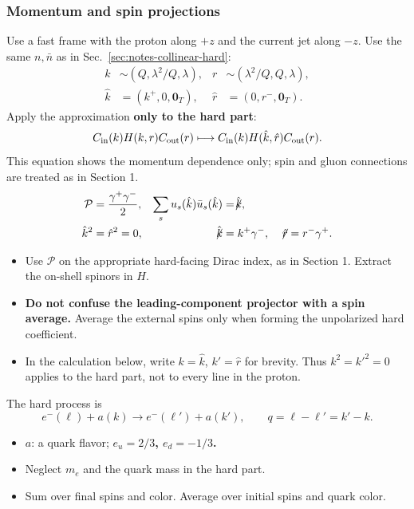 \documentclass[14pt,a4paper]{extarticle}
\numberwithin{equation}{section}
\newcommand{\slsh}[1]{\not\!#1}
\begin{document}
\subsubsection{Momentum and spin projections}
Use a fast frame with the proton along $+z$ and the current jet along $-z$.
Use the same $n,\bar n$ as in Sec.~\ref{sec:notes-collinear-hard}:
\begin{align}
 k&\sim(Q,\lambda^2/Q,\lambda),&
 r&\sim(\lambda^2/Q,Q,\lambda),\\
 \hat k&=(k^+,0,\bm0_T),&
 \hat r&=(0,r^-,\bm0_T).
\end{align}
Apply the approximation \textbf{only to the hard part}:
\begin{equation}
 C_{\rm in}(k)H(k,r)C_{\rm out}(r)
 \longmapsto
 C_{\rm in}(k)H(\hat k,\hat r)C_{\rm out}(r).
\end{equation}
This equation shows the momentum dependence only; spin and gluon
connections are treated as in Section 1.
\begin{align}
 \mathcal P&=\frac{\gamma^+\gamma^-}{2},&
 \sum_su_s(\hat k)\bar u_s(\hat k)&=\slsh{\hat k},\\
 \hat k^2&=\hat r^2=0,&
 \slsh{\hat k}&=k^+\gamma^-,\quad
 \slsh{\hat r}=r^-\gamma^+.
\end{align}
\begin{itemize}
 \item Use $\mathcal P$ on the appropriate hard-facing Dirac index,
 as in Section 1. Extract the on-shell spinors in $H$.
 \item \textbf{Do not confuse the leading-component projector with a spin average.}
 Average the external spins only when forming the unpolarized hard coefficient.
 \item In the calculation below, write $k=\hat k$, $k'=\hat r$ for brevity.
 Thus $k^2=k'^2=0$ applies to the hard part, not to every line in the proton.
\end{itemize}
The hard process is
\begin{equation}
 e^-(\ell)+a(k)\longrightarrow e^-(\ell')+a(k'),\qquad
 q=\ell-\ell'=k'-k.
\end{equation}
\begin{itemize}
 \item $a$: a quark flavor; \textbf{$e_u=2/3$, $e_d=-1/3$.}
 \item Neglect $m_e$ and the quark mass in the hard part.
 \item Sum over final spins and color. Average over initial spins and quark color.
\end{itemize}
\end{document}
